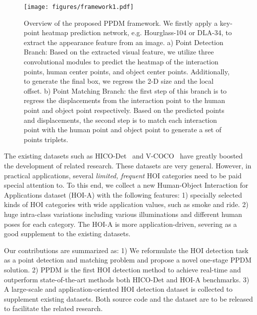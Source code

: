 \documentclass[10pt,twocolumn,letterpaper]{article}
\begin{document}
\begin{figure*}[htb]
  \vspace{-2mm}
  \centering
  \texttt{[image: figures/framework1.pdf]}
  \vspace{-0.5mm}
  \caption{Overview of the proposed PPDM framework. We firstly apply a key-point heatmap prediction network, e.g. Hourglass-104 or DLA-34, to extract the appearance feature from an image. a) Point Detection Branch: Based on the extracted visual feature, we utilize three convolutional modules to predict the heatmap of the interaction points, human center points, and object center points. Additionally, to generate the final box, we regress the 2-D size and the local offset. b) Point Matching Branch: the first step of this branch is to regress the displacements from the interaction point to the human point and object point respectively. Based on the predicted points and displacements, the second step is to match each interaction point with the human point and object point to generate a set of points triplets. }
  \label{f_work}
  \vspace{-3mm}
\end{figure*}

The existing  datasets such as HICO-Det~\cite{qi2018learning} and V-COCO~\cite{gupta2015visual} have greatly boosted the development of related research. 
These datasets are very general.   However, in practical applications, several \emph{limited, frequent} HOI categories need to be paid special attention to. To this end,  we collect a new Human-Object Interaction for Applications dataset  (HOI-A)  with the following features: 1) specially selected  kinds of HOI categories with wide application values, such as smoke and ride. 
 2) huge intra-class variations including various illuminations and different human poses for each category.  The HOI-A is more application-driven, severing as a good supplement to the existing datasets.


Our contributions are summarized as: 1) We reformulate the HOI detection task as a point detection and matching problem and propose a novel one-stage PPDM solution.  2) PPDM is the first HOI detection method to achieve real-time and outperform state-of-the-art methods both HICO-Det and HOI-A benchmarks. 3) A large-scale and application-oriented  HOI detection dataset is collected to supplement existing datasets. Both source code and the dataset are to be released to facilitate the related research.
\end{document}

